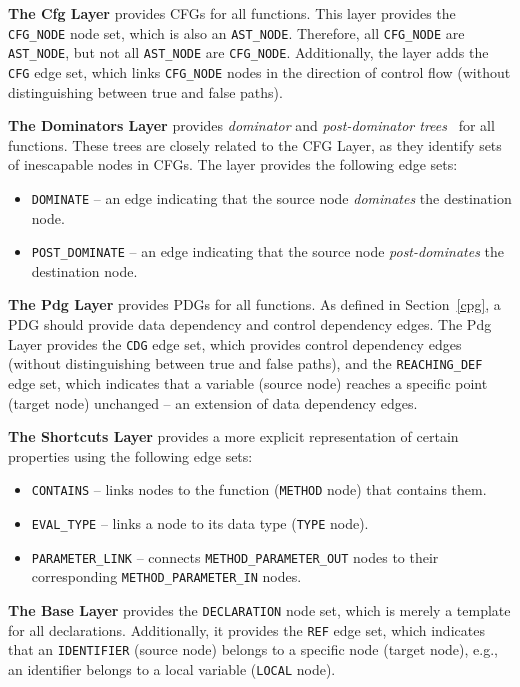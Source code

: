 \textbf{The Cfg Layer} provides CFGs for all functions. This layer provides the \texttt{CFG\_NODE} node set, which is also an \texttt{AST\_NODE}. Therefore, all \texttt{CFG\_NODE} are \texttt{AST\_NODE}, but not all \texttt{AST\_NODE} are \texttt{CFG\_NODE}. Additionally, the layer adds the \texttt{CFG} edge set, which links \texttt{CFG\_NODE} nodes in the direction of control flow (without distinguishing between true and false paths).

\textbf{The Dominators Layer} provides \textit{dominator} and \textit{post-dominator trees}~\cite{princeton-dominators} for all functions. These trees are closely related to the CFG Layer, as they identify sets of inescapable nodes in CFGs. The layer provides the following edge sets:
\begin{itemize}
    \item \texttt{DOMINATE} -- an edge indicating that the source node \textit{dominates} the destination node.
    \item \texttt{POST\_DOMINATE} -- an edge indicating that the source node \textit{post-dominates} the destination node.
\end{itemize}

\textbf{The Pdg Layer} provides PDGs for all functions. As defined in Section~\ref{cpg}, a PDG should provide data dependency and control dependency edges. The Pdg Layer provides the \texttt{CDG} edge set, which provides control dependency edges (without distinguishing between true and false paths), and the \texttt{REACHING\_DEF} edge set, which indicates that a variable (source node) reaches a specific point (target node) unchanged -- an extension of data dependency edges.

\textbf{The Shortcuts Layer} provides a more explicit representation of certain properties using the following edge sets:
\begin{itemize}
    \item \texttt{CONTAINS} -- links nodes to the function (\texttt{METHOD} node) that contains them.
    \item \texttt{EVAL\_TYPE} -- links a node to its data type (\texttt{TYPE} node).
    \item \texttt{PARAMETER\_LINK} -- connects \texttt{METHOD\_PARAMETER\_OUT} nodes to their corresponding \texttt{METHOD\_PARAMETER\_IN} nodes.
\end{itemize}

\textbf{The Base Layer} provides the \texttt{DECLARATION} node set, which is merely a template for all declarations. Additionally, it provides the \texttt{REF} edge set, which indicates that an \texttt{IDENTIFIER} (source node) belongs to a specific node (target node), e.g., an identifier belongs to a local variable (\texttt{LOCAL} node).

